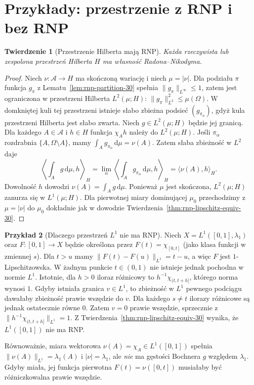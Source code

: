 \documentclass[11pt,a4paper,oneside]{book}
\numberwithin{equation}{chapter}
\theoremstyle{plain}
\newtheorem{twierdzenie}{Twierdzenie}[chapter]
\theoremstyle{definition}
\newtheorem{przyklad}[twierdzenie]{Przykład}
\theoremstyle{remark}
\begin{document}
\section{Przykłady: przestrzenie z RNP i bez RNP}
\label{sec:rnp-examples-30}
\begin{twierdzenie}[Przestrzenie Hilberta mają RNP]
\label{thm:hilbert-rnp-30}
Każda rzeczywista lub zespolona przestrzeń Hilberta $H$
ma własność Radona--Nikodyma.
\end{twierdzenie}
\begin{proof}
Niech $\nu:\mathcal A\to H$ ma skończoną wariację
i niech $\mu=|\nu|$. Dla podziału $\pi$ funkcja
$g_\pi$ z Lematu~\ref{lem:rnp-partition-30} spełnia
$\|g_\pi\|_{L^\infty}\le1$, zatem jest ograniczona
w przestrzeni Hilberta $L^2(\mu;H)$:
$\|g_\pi\|_{L^2}^2\le\mu(\Omega)$.
W domkniętej kuli tej przestrzeni istnieje
słabo zbieżna podsieć $(g_{\pi_\alpha})$,
gdyż kula przestrzeni Hilberta jest słabo zwarta.
Niech $g\in L^2(\mu;H)$ będzie jej granicą.
Dla każdego $A\in\mathcal A$ i $h\in H$ funkcja
$\chi_A h$ należy do $L^2(\mu;H)$. Jeśli
$\pi_\alpha$ rozdrabnia $\{A,\Omega\setminus A\}$,
mamy $\int_Ag_{\pi_\alpha}\,\mathrm d\mu=\nu(A)$.
Zatem słaba zbieżność w $L^2$ daje
\[
 \left\langle\int_Ag\,\mathrm d\mu,h\right\rangle_H
 =\lim_\alpha\left\langle
 \int_Ag_{\pi_\alpha}\,\mathrm d\mu,h\right\rangle_H
 =\langle\nu(A),h\rangle_H.
\]
Dowolność $h$ dowodzi $\nu(A)=\int_Ag\,\mathrm d\mu$.
Ponieważ $\mu$ jest skończona, $L^2(\mu;H)$
zanurza się w $L^1(\mu;H)$.
Dla pierwotnej miary dominującej $\mu_0$
przechodzimy z $\mu=|\nu|$ do $\mu_0$ dokładnie jak
w dowodzie Twierdzenia~\ref{thm:rnp-lipschitz-equiv-30}.
\end{proof}

\begin{przyklad}[Dlaczego przestrzeń $L^1$ nie ma RNP]
\label{ex:L1-no-RNP-30}
Niech $X=L^1([0,1],\lambda_1)$ oraz
$F:[0,1]\to X$ będzie określona przez
$F(t)=\chi_{[0,t]}$ (jako klasa funkcji w zmiennej $s$).
Dla $t>u$ mamy $\|F(t)-F(u)\|_{L^1}=t-u$,
a więc $F$ jest $1$-Lipschitzowska.
W żadnym punkcie $t\in(0,1)$ nie istnieje jednak
pochodna w normie $L^1$. Istotnie, dla $h>0$
iloraz różnicowy to
$h^{-1}\chi_{(t,t+h]}$, którego norma wynosi $1$.
Gdyby istniała granica $v\in L^1$, to zbieżność
w $L^1$ pewnego podciągu dawałaby zbieżność
prawie wszędzie do $v$. Dla każdego $s\ne t$
ilorazy różnicowe są jednak ostatecznie równe $0$.
Zatem $v=0$ prawie wszędzie, sprzecznie z
$\|h^{-1}\chi_{(t,t+h]}\|_{L^1}=1$.
Z Twierdzenia~\ref{thm:rnp-lipschitz-equiv-30}
wynika, że $L^1([0,1])$ nie ma RNP.

Równoważnie, miara wektorowa
$\nu(A)=\chi_A\in L^1([0,1])$ spełnia
$\|\nu(A)\|_{L^1}=\lambda_1(A)$ i
$|\nu|=\lambda_1$, ale \emph{nie} ma gęstości
Bochnera $g$ względem $\lambda_1$.
Gdyby miała, jej funkcja pierwotna $F(t)=\nu([0,t])$
musiałaby być różniczkowalna prawie wszędzie.
\end{przyklad}
\end{document}
